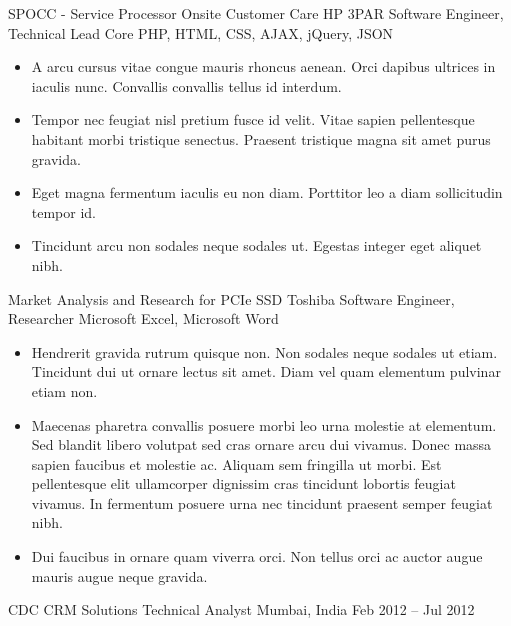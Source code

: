\documentclass[10pt, a4paper]{sivu}
\begin{document}
        \dividergray

        \project
            {SPOCC - Service Processor Onsite Customer Care}
            {HP 3PAR}
            {Software Engineer, Technical Lead}
            {Core PHP, HTML, CSS, AJAX, jQuery, JSON}
        
        \begin{itemize}
            \item A arcu cursus vitae congue mauris rhoncus aenean. Orci dapibus ultrices in iaculis nunc. Convallis convallis tellus id interdum.\smallskip
            \item Tempor nec feugiat nisl pretium fusce id velit. Vitae sapien pellentesque habitant morbi tristique senectus. Praesent tristique magna sit amet purus gravida.\smallskip
            \item Eget magna fermentum iaculis eu non diam. Porttitor leo a diam sollicitudin tempor id.\smallskip
            \item Tincidunt arcu non sodales neque sodales ut. Egestas integer eget aliquet nibh. \smallskip
        \end{itemize}
        
        \dividergray
        
        \project
            {Market Analysis and Research for PCIe SSD}
            {Toshiba}
            {Software Engineer, Researcher}
            {Microsoft Excel, Microsoft Word}
        
        \begin{itemize}
            \item Hendrerit gravida rutrum quisque non. Non sodales neque sodales ut etiam. Tincidunt dui ut ornare lectus sit amet. Diam vel quam elementum pulvinar etiam non.\smallskip
            \item  Maecenas pharetra convallis posuere morbi leo urna molestie at elementum. Sed blandit libero volutpat sed cras ornare arcu dui vivamus. Donec massa sapien faucibus et molestie ac. Aliquam sem fringilla ut morbi. Est pellentesque elit ullamcorper dignissim cras tincidunt lobortis feugiat vivamus. In fermentum posuere urna nec tincidunt praesent semper feugiat nibh.\smallskip
            \item  Dui faucibus in ornare quam viverra orci. Non tellus orci ac auctor augue mauris augue neque gravida.\smallskip
        \end{itemize}


\smallskip
\divider
\smallskip

    \company
        {CDC CRM Solutions}
        {Technical Analyst}
        {Mumbai, India}
        {Feb 2012 – Jul 2012}
        
\end{document}
